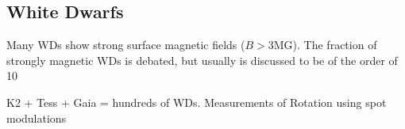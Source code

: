 {\color{red} \subsection{White Dwarfs}}
Many WDs show strong surface magnetic fields ($B>$3MG). The fraction of strongly magnetic WDs is debated, but usually is discussed to be of the order of 10 

K2 + Tess + Gaia = hundreds of WDs. Measurements of Rotation using spot modulations